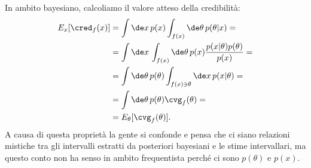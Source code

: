 In ambito bayesiano, calcoliamo il valore atteso della credibilità:
\begin{align*}
	E_x[\cred_f(x)]
	&= \int \de x\, p(x)
	\int_{f(x)} \de\theta\, p(\theta|x) = \\
	&= \int \de x\, \int_{f(x)} \de\theta\,
	p(x) \frac{p(x|\theta) p(\theta)}{p(x)} = \\
	&= \int \de \theta\, p(\theta)
	\int_{f(x)\ni\theta} \de x\, p(x|\theta) = \\
	&= \int \de \theta\, p(\theta) \cvg_f(\theta) = \\
	&= E_\theta[\cvg_f(\theta)].
\end{align*}
A causa di questa proprietà la gente si confonde e pensa che ci siano relazioni mistiche tra gli intervalli estratti da posteriori bayesiani e le stime intervallari,
ma questo conto non ha senso in ambito frequentista perché ci sono $p(\theta)$ e $p(x)$.
